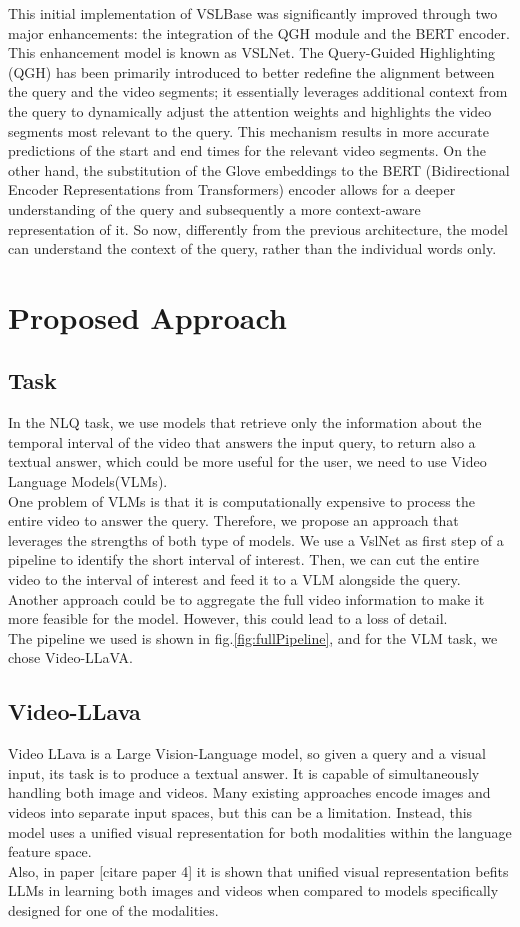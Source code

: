 \documentclass[conference]{IEEEtran}
\begin{document}
This initial implementation of VSLBase was significantly improved through two major enhancements: the integration of the QGH module and the BERT encoder. This enhancement model is known as VSLNet.
The Query-Guided Highlighting (QGH)  has been primarily introduced to better redefine the alignment between the query and the video segments; it essentially leverages additional context from the query to dynamically adjust the attention weights and highlights the video segments most relevant to the query. This mechanism results in more accurate predictions of the start and end times for the relevant video segments. On the other hand, the substitution of the Glove embeddings to the BERT (Bidirectional Encoder Representations from Transformers) encoder allows for a deeper understanding of the query and subsequently a more context-aware representation of it. So now, differently from the previous architecture, the model can understand the context of the query, rather than the individual words only.


\section{Proposed Approach}
\subsection{Task}
In the NLQ task, we use models that retrieve only the
information about the temporal interval of the video that
answers the input query, to return also a textual answer,
which could be more useful for the user, we need to use
Video Language Models(VLMs).\\
One problem of VLMs is that it is computationally expensive to process the entire video to answer the query. Therefore, we propose an approach that leverages the strengths of both type of models. We use a VslNet as first step of a pipeline to identify the short interval of interest. Then, we can cut the entire video to the interval of interest and feed it to a VLM alongside the query.
Another approach could be to aggregate the full video information to make it more feasible for the model. However, this could lead to a loss of detail.\\

The pipeline we used is shown in fig.\ref{fig:fullPipeline}, and for the VLM task, we chose Video-LLaVA.

\subsection{Video-LLava}
Video LLava is a Large Vision-Language model, so given a query and a visual input, its task is to produce a textual answer.  It is capable of simultaneously handling both image and videos. Many existing approaches encode images and videos into separate input spaces, but this can be a limitation. Instead, this model uses a unified visual representation for both modalities within the language feature space.\\
Also, in paper [citare paper 4] it is shown that unified visual representation befits LLMs in learning both images and videos when compared to models specifically designed for one of the modalities.
\end{document}

